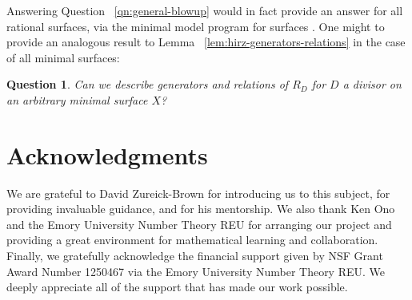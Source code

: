 \documentclass{amsart}
\theoremstyle{plain}
\newtheorem{question}[thm]{Question}
\theoremstyle{definition}
\theoremstyle{remark}
\numberwithin{equation}{section}
\begin{document}
Answering Question ~\ref{qn:general-blowup} would in fact provide an answer for all rational surfaces, via the minimal model program for surfaces .  One might to provide an analogous result to Lemma ~\ref{lem:hirz-generators-relations}  in the case of all minimal surfaces:
\begin{question}
\label{qn:general-minimal-surface}
Can we describe generators and relations of $R_D$ for $D$ a divisor on an arbitrary minimal surface $X$?
\end{question}


\section{Acknowledgments}
We are grateful to David Zureick-Brown for introducing us to this
subject, for providing invaluable guidance,
and for his mentorship. We also thank Ken Ono and the
Emory University Number Theory REU for arranging our project and
providing a great environment for mathematical learning and
collaboration.
Finally, we gratefully acknowledge the financial support given by
NSF Grant Award Number 1250467 via the Emory University Number
Theory REU. We deeply appreciate all of the support that has made
our work possible.


\nocite{*}
{}

\end{document}
